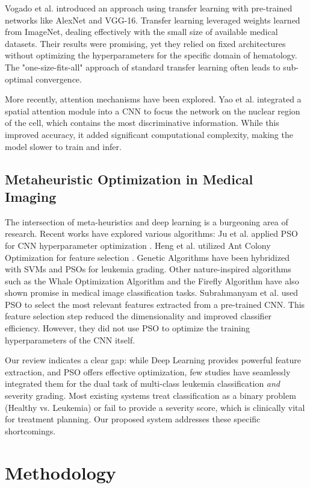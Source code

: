 \documentclass[12pt, a4paper]{article}
\begin{document}
Vogado et al. introduced an approach using transfer learning with pre-trained networks like AlexNet and VGG-16. Transfer learning leveraged weights learned from ImageNet, dealing effectively with the small size of available medical datasets. Their results were promising, yet they relied on fixed architectures without optimizing the hyperparameters for the specific domain of hematology. The "one-size-fits-all" approach of standard transfer learning often leads to sub-optimal convergence.

More recently, attention mechanisms have been explored. Yao et al. integrated a spatial attention module into a CNN to focus the network on the nuclear region of the cell, which contains the most discriminative information. While this improved accuracy, it added significant computational complexity, making the model slower to train and infer.

\subsection{Metaheuristic Optimization in Medical Imaging}
The intersection of meta-heuristics and deep learning is a burgeoning area of research. Recent works have explored various algorithms: Ju et al. applied PSO for CNN hyperparameter optimization \cite{r16}. Heng et al. utilized Ant Colony Optimization for feature selection \cite{r17}. Genetic Algorithms have been hybridized with SVMs \cite{r18} and PSOs \cite{r20} for leukemia grading. Other nature-inspired algorithms such as the Whale Optimization Algorithm \cite{r19} and the Firefly Algorithm \cite{r21} have also shown promise in medical image classification tasks.
Subrahmanyam et al. used PSO to select the most relevant features extracted from a pre-trained CNN. This feature selection step reduced the dimensionality and improved classifier efficiency. However, they did not use PSO to optimize the training hyperparameters of the CNN itself.

Our review indicates a clear gap: while Deep Learning provides powerful feature extraction, and PSO offers effective optimization, few studies have seamlessly integrated them for the dual task of multi-class leukemia classification \textit{and} severity grading. Most existing systems treat classification as a binary problem (Healthy vs. Leukemia) or fail to provide a severity score, which is clinically vital for treatment planning. Our proposed system addresses these specific shortcomings.

\section{Methodology}
\end{document}
